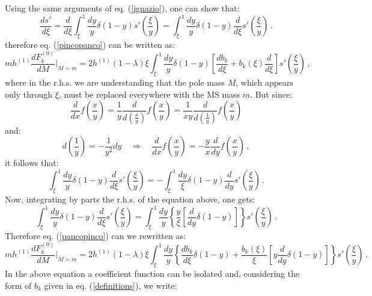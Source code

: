 \documentclass[10pt,a4paper]{article}
\begin{document}
Using the same arguments of eq. (\ref{ignazio}), one can show that:
\begin{equation}
\frac{ds'}{d\xi} = \frac{d}{d\xi}\int_\xi^1\frac{dy}{y}\delta(1-y)s'\left(\frac{\xi}{y}\right) = \int_\xi^1\frac{dy}{y}\delta(1-y)\frac{d}{d\xi}s'\left(\frac{\xi}{y}\right)\,.
\end{equation}
therefore eq. (\ref{pincopanco}) can be written as:
\begin{equation}
mh^{(1)}\frac{dF^{(0)}_k}{dM}\bigg|_{M=m} =
2h^{(1)}(1-\lambda)\xi\int_\xi^1\frac{dy}{y}\delta(1-y)\left[\frac{db_k}{d\xi}+b_k(\xi)\frac{d}{d\xi}\right]s'\left(\frac{\xi}{y}\right)\,,
\label{pancopinco}
\end{equation}
where in the r.h.s. we are understanding that the pole mass $M$, which appears only through $\xi$, must be replaced everywhere with the $\overline{\mbox{MS}}$ mass $m$. But since:
\begin{equation}
\frac{d}{dx}f\left(\frac{x}{y}\right) = \frac1{y}\frac{d}{d\left(\frac{x}{y}\right)}f\left(\frac{x}{y}\right) = \frac1{xy}\frac{d}{d\left(\frac{1}{y}\right)}f\left(\frac{x}{y}\right)
\end{equation}
and:
\begin{equation}
d\left(\frac1y\right) = -\frac1{y^2}dy\quad\Rightarrow \quad \frac{d}{dx}f\left(\frac{x}{y}\right) = -\frac{y}{x}\frac{d}{dy}f\left(\frac{x}{y}\right)\,,
\end{equation}
it follows that:
\begin{equation}
\int_\xi^1\frac{dy}y\delta(1-y)\frac{d}{d\xi}s'\left(\frac{\xi}{y}\right) = -\int_\xi^1\frac{dy}\xi\delta(1-y)\frac{d}{dy}s'\left(\frac{\xi}{y}\right)\,.
\end{equation}
Now, integrating by parts the r.h.s. of the equation above, one gets:
\begin{equation}
\int_\xi^1\frac{dy}y\delta(1-y)\frac{d}{d\xi}s'\left(\frac{\xi}{y}\right)=\int_\xi^1\frac{dy}y\left\{\frac{y}{\xi}\left[\frac{d}{dy}\delta(1-y)\right]\right\}s'\left(\frac{\xi}{y}\right)\,.
\end{equation}
Therefore eq. (\ref{pancopinco}) can we rewritten as:
\begin{equation}
mh^{(1)}\frac{dF^{(0)}_k}{dM}\bigg|_{M=m} = 2h^{(1)}(1-\lambda)\xi\int_\xi^1\frac{dy}{y}\left\{\frac{db_k}{d\xi}\delta(1-y)+\frac{b_k(\xi)}{\xi}\left[y\frac{d}{dy}\delta(1-y)\right]\right\}s'\left(\frac{\xi}{y}\right)\,.
\end{equation}
In the above equation a coefficient function can be isolated and, considering the form of $b_k$ given in eq. (\ref{definitions}), we write:
\end{document}

